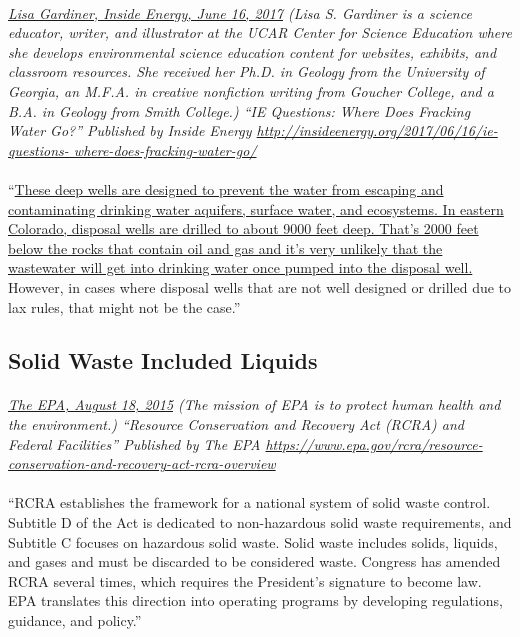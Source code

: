 \documentclass{article}
\begin{document}
\paragraph{}
\small
\textit{
\underline{Lisa Gardiner, Inside Energy, June 16, 2017}
(Lisa S. Gardiner is a science educator, writer, and illustrator at the UCAR Center for Science Education where she develops environmental science education content for websites, exhibits, and classroom resources. She received her Ph.D. in Geology from the University of Georgia, an M.F.A. in creative nonfiction writing from Goucher College, and a B.A. in Geology from Smith College.) ``IE Questions: Where Does Fracking Water Go?'' Published by Inside Energy \newline
\url{http://insideenergy.org/2017/06/16/ie-questions- where-does-fracking-water-go/}}
\normalsize

\paragraph{}
``\ul{These deep wells are designed to prevent the water from escaping and contaminating drinking water aquifers, surface water, and ecosystems. In eastern Colorado, disposal wells are drilled to about 9000 feet deep. That's 2000 feet below the rocks that contain oil and gas and it's very unlikely that the wastewater will get into drinking water once pumped into the disposal well.} However, in cases where disposal wells that are not well designed or drilled due to lax rules, that might not be the case.''

\subsection{Solid Waste Included Liquids}
\paragraph{}
\small
\textit{
\underline{The EPA, August 18, 2015}
(The mission of EPA is to protect human health and the environment.) “Resource Conservation and Recovery Act (RCRA) and Federal Facilities” Published by The EPA
\url{https://www.epa.gov/rcra/resource-conservation-and-recovery-act-rcra-overview}}
\normalsize

\paragraph{}
``RCRA establishes the framework for a national system of solid waste control. Subtitle D of the Act is dedicated to non-hazardous solid waste requirements, and Subtitle C focuses on hazardous solid waste. Solid waste includes solids, liquids, and gases and must be discarded to be considered waste. Congress has amended RCRA several times, which requires the President’s signature to become law. EPA translates this direction into operating programs by developing regulations, guidance, and policy.”
\end{document}
